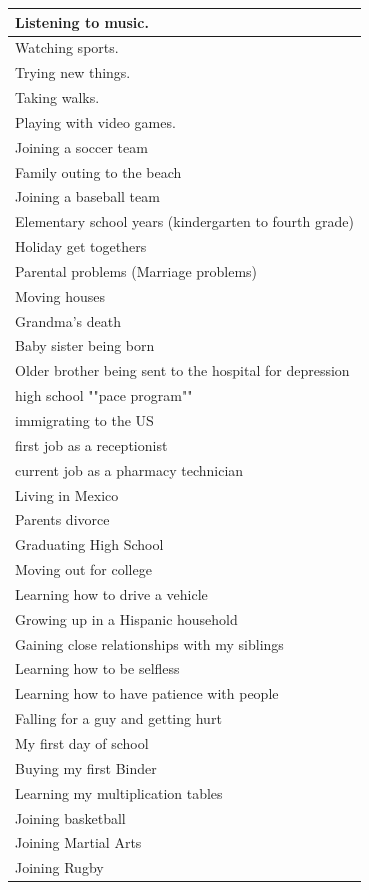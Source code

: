 \documentclass[
  .7em,
  letterpaper,
  DIV=11,
  numbers=noendperiod]{scrartcl}
\begin{document}
\begin{table}
\begin{tabular}{l}
\hline
Listening to music.\\
\hline
Watching sports.\\
\hline
Trying new things.\\
\hline
Taking walks.\\
\hline
Playing with video games.\\
\hline
Joining a soccer team\\
\hline
Family outing to the beach\\
\hline
Joining a baseball team\\
\hline
Elementary school years (kindergarten to fourth grade)\\
\hline
Holiday get togethers\\
\hline
Parental problems (Marriage problems)\\
\hline
Moving houses\\
\hline
Grandma's death\\
\hline
Baby sister being born\\
\hline
Older brother being sent to the hospital for depression\\
\hline
high school ""pace program""\\
\hline
immigrating to the US\\
\hline
first job as a receptionist\\
\hline
current job as a pharmacy technician\\
\hline
Living in Mexico\\
\hline
Parents divorce\\
\hline
Graduating High School\\
\hline
Moving out for college\\
\hline
Learning how to drive a vehicle\\
\hline
Growing up in a Hispanic household\\
\hline
Gaining close relationships with my siblings\\
\hline
Learning how to be selfless\\
\hline
Learning how to have patience with people\\
\hline
Falling for a guy and getting hurt\\
\hline
My first day of school\\
\hline
Buying my first Binder\\
\hline
Learning my multiplication tables\\
\hline
Joining basketball\\
\hline
Joining Martial Arts\\
\hline
Joining Rugby\\

\end{tabular}
\end{table}
\end{document}
